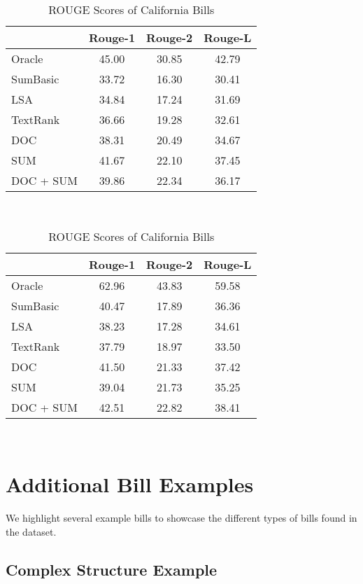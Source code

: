 \documentclass[11pt,a4paper]{article}
\begin{document}
\begin{table}[!htbp]
\caption{ROUGE Scores of California Bills}\label{tab:rougeca}
    \begin{tabular}{|l|c|c|c|}
    \hline
         &  Rouge-1 & Rouge-2 & Rouge-L \\ \hline
         Oracle & 45.00  & 30.85 & 42.79 \\
        \hline
        SumBasic &  33.72 &	16.30 &	30.41\\ 
        LSA &  34.84 &	17.24 &	31.69\\ 
        TextRank &  36.66 &	19.28 &	32.61\\ 
        \hline 
        DOC & 38.31 & 20.49  & 34.67 \\
        SUM &  41.67 & 22.10 & 37.45\\ 
        DOC + SUM &  39.86 & 22.34 & 36.17\\ 
    
        \hline
    \end{tabular}\\
    \begin{tabular}{|l|c|c|c|}
        \hline
         &  Rouge-1 & Rouge-2 & Rouge-L \\ \hline
         Oracle & 62.96  & 43.83 & 59.58 \\
        \hline
        SumBasic &  40.47 &	17.89 &	36.36\\ 
        LSA &  38.23 &	17.28 &	34.61 \\ 
        TextRank &  37.79 &	18.97 &	33.50 \\ 
        \hline 
        DOC & 41.50 & 21.33 &  37.42 \\
        SUM &  39.04 & 21.73 & 35.25 \\ 
        DOC + SUM &  42.51 & 22.82 & 38.41 \\ 
        \hline
    \end{tabular}\\
    \end{table}

\section{Additional Bill Examples}

We highlight several example bills to showcase the different types of bills found in the dataset.

\subsection{Complex Structure Example}
\end{document}
